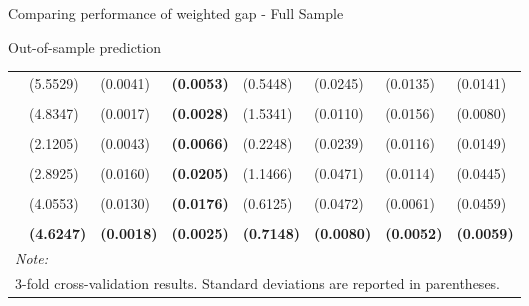\documentclass[
  ignorenonframetext,
]{beamer}
\begin{document}
\begin{frame}{Comparing performance of weighted gap - Full Sample}
\begin{block}{Out-of-sample prediction}
{\begin{tabular}[t]{lll>{}lllll}
 & (5.5529) & (0.0041) & \textbf{(0.0053)} & (0.5448) & (0.0245) & (0.0135) & (0.0141)\\
\addlinespace
\cellcolor{gray!6}{c.linear} & \cellcolor{gray!6}{-106.5647} & \cellcolor{gray!6}{0.6846} & \textbf{\cellcolor{gray!6}{0.6158}} & \cellcolor{gray!6}{4.0160} & \cellcolor{gray!6}{0.4621} & \cellcolor{gray!6}{0.3113} & \cellcolor{gray!6}{0.3108}\\
 & (4.8347) & (0.0017) & \textbf{(0.0028)} & (1.5341) & (0.0110) & (0.0156) & (0.0080)\\
\addlinespace
\cellcolor{gray!6}{c.bn2.r20} & \cellcolor{gray!6}{-76.7863} & \cellcolor{gray!6}{0.6908} & \textbf{\cellcolor{gray!6}{0.6137}} & \cellcolor{gray!6}{0.2458} & \cellcolor{gray!6}{0.4327} & \cellcolor{gray!6}{0.3208} & \cellcolor{gray!6}{0.2907}\\
 & (2.1205) & (0.0043) & \textbf{(0.0066)} & (0.2248) & (0.0239) & (0.0116) & (0.0149)\\
\addlinespace
\cellcolor{gray!6}{c.bn6.r20} & \cellcolor{gray!6}{-86.4636} & \cellcolor{gray!6}{0.6757} & \textbf{\cellcolor{gray!6}{0.5987}} & \cellcolor{gray!6}{0.2144} & \cellcolor{gray!6}{0.4713} & \cellcolor{gray!6}{0.3231} & \cellcolor{gray!6}{0.3286}\\
 & (2.8925) & (0.0160) & \textbf{(0.0205)} & (1.1466) & (0.0471) & (0.0114) & (0.0445)\\
\addlinespace
\cellcolor{gray!6}{c.bn6} & \cellcolor{gray!6}{-101.2737} & \cellcolor{gray!6}{0.6693} & \textbf{\cellcolor{gray!6}{0.5935}} & \cellcolor{gray!6}{0.3956} & \cellcolor{gray!6}{0.4611} & \cellcolor{gray!6}{0.3250} & \cellcolor{gray!6}{0.3203}\\
 & (4.0553) & (0.0130) & \textbf{(0.0176)} & (0.6125) & (0.0472) & (0.0061) & (0.0459)\\
\addlinespace
\textbf{\cellcolor{gray!6}{BIS Basel gap}} & \textbf{\cellcolor{gray!6}{-110.9026}} & \textbf{\cellcolor{gray!6}{0.6707}} & \textbf{\textbf{\cellcolor{gray!6}{0.5932}}} & \textbf{\cellcolor{gray!6}{3.3012}} & \textbf{\cellcolor{gray!6}{0.4490}} & \textbf{\cellcolor{gray!6}{0.3250}} & \textbf{\cellcolor{gray!6}{0.3073}}\\
\textbf{} & \textbf{(4.6247)} & \textbf{(0.0018)} & \textbf{\textbf{(0.0025)}} & \textbf{(0.7148)} & \textbf{(0.0080)} & \textbf{(0.0052)} & \textbf{(0.0059)}\\
\bottomrule
\multicolumn{8}{l}{\rule{0pt}{1em}\textit{Note: }}\\
\multicolumn{8}{l}{\rule{0pt}{1em}3-fold cross-validation results. Standard deviations are reported in parentheses.}\\
\end{tabular}}
\end{block}
\end{frame}
\end{document}

